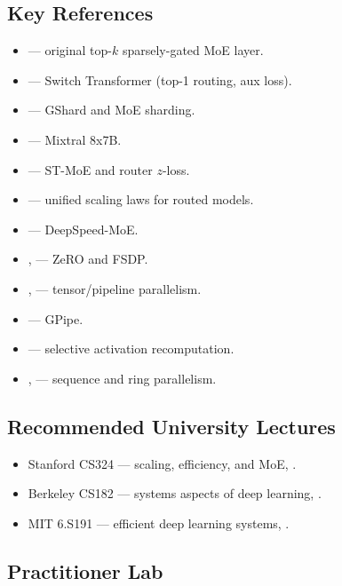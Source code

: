 \subsection{Key References}

\begin{itemize}
  \item \citet{shazeer2017outrageously} --- original top-$k$
        sparsely-gated MoE layer.
  \item \citet{fedus2021switch} --- Switch Transformer (top-1
        routing, aux loss).
  \item \citet{lepikhin2021gshard} --- GShard and MoE sharding.
  \item \citet{jiang2024mixtral} --- Mixtral 8x7B.
  \item \citet{zoph2022stmoe} --- ST-MoE and router $z$-loss.
  \item \citet{clark2022unified} --- unified scaling laws for routed
        models.
  \item \citet{rajbhandari2022deepspeedmoe} --- DeepSpeed-MoE.
  \item \citet{rajbhandari2020zero}, \citet{zhao2023fsdp} --- ZeRO
        and FSDP.
  \item \citet{shoeybi2019megatron}, \citet{narayanan2021efficient}
        --- tensor/pipeline parallelism.
  \item \citet{huang2019gpipe} --- GPipe.
  \item \citet{korthikanti2023reducing} --- selective activation
        recomputation.
  \item \citet{li2023sequence}, \citet{liu2023ringattention} ---
        sequence and ring parallelism.
\end{itemize}

\subsection{Recommended University Lectures}

\begin{itemize}
  \item Stanford CS324 --- scaling, efficiency, and MoE,
        \citet{stanford_cs324}.
  \item Berkeley CS182 --- systems aspects of deep learning,
        \citet{berkeley_cs182}.
  \item MIT 6.S191 --- efficient deep learning systems,
        \citet{mit_6s191}.
\end{itemize}

\subsection{Practitioner Lab}

